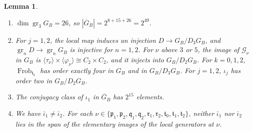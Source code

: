 \documentclass[11pt]{amsart}
\numberwithin{equation}{section}
\newtheorem{lemma}[equation]{Lemma}
\theoremstyle{definition}
\theoremstyle{remark}
\DeclareMathOperator{\Frob}{Frob}
\begin{document}
\begin{lemma}\label{tw:retained-quotient}
\begin{enumerate}
\item[(a)] $\dim\operatorname{gr}_3G_B=26$, so $|\overline G_B|=2^{8+15+26}=2^{49}$.
\item[(b)] For $j=1,2$, the local map induces an injection
 $D\to G_B/D_3G_B$, and $\operatorname{gr}_nD\to\operatorname{gr}_nG_B$ is
 injective for $n=1,2$. For $\nu$ above $3$ or $5$, the image of
 $\mathcal G_\nu$ in $G_B$ is
 $\langle\tau_\nu\rangle\times\langle\varphi_\nu\rangle\cong C_2\times C_2$,
 and it injects into $G_B/D_2G_B$. For $k=0,1,2$, $\Frob_{\mathfrak t_k}$ has
 order exactly four in $G_B$ and in $G_B/D_3G_B$. For $j=1,2$, $\iota_j$ has
 order two in $G_B/D_2G_B$.
\item[(c)] The conjugacy class of $\iota_1$ in $\overline G_B$ has $2^{15}$
 elements.
\item[(d)] We have $\bar\iota_1\ne\bar\iota_2$. For each
 $\nu\in\{\mathfrak p_1,\mathfrak p_2,\mathfrak q_1,\mathfrak q_2,\mathfrak r_1,\mathfrak r_2,\mathfrak t_0,\mathfrak t_1,\mathfrak t_2\}$,
 neither $\bar\iota_1$ nor $\bar\iota_2$ lies in the span of the elementary
 images of the local generators at $\nu$.
\end{enumerate}
\end{lemma}
\end{document}
